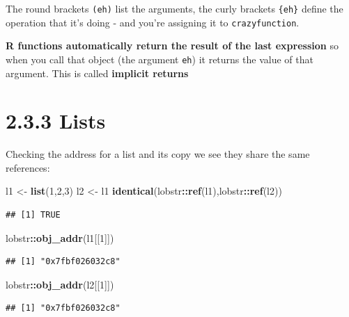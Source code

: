 \documentclass[]{book}
\newenvironment{Shaded}{\begin{snugshade}}{\end{snugshade}}
\newcommand{\DecValTok}[1]{\textcolor[rgb]{0.00,0.00,0.81}{#1}}
\newcommand{\KeywordTok}[1]{\textcolor[rgb]{0.13,0.29,0.53}{\textbf{#1}}}
\newcommand{\NormalTok}[1]{#1}
\newcommand{\OperatorTok}[1]{\textcolor[rgb]{0.81,0.36,0.00}{\textbf{#1}}}
\newcommand{\StringTok}[1]{\textcolor[rgb]{0.31,0.60,0.02}{#1}}
\begin{document}
The round brackets \texttt{(eh)} list the arguments, the curly brackets \texttt{\{eh\}} define the operation that it's doing - and you're assigning it to \texttt{crazyfunction}.

\textbf{R functions automatically return the result of the last expression} so when you call that object (the argument \texttt{eh}) it returns the value of that argument. This is called \textbf{implicit returns}

\hypertarget{lists}{%
\section*{2.3.3 Lists}\label{lists}}

Checking the address for a list and its copy we see they share the same references:

\begin{Shaded}
\begin{Highlighting}[]
\NormalTok{l1 <-}\StringTok{ }\KeywordTok{list}\NormalTok{(}\DecValTok{1}\NormalTok{,}\DecValTok{2}\NormalTok{,}\DecValTok{3}\NormalTok{)}
\NormalTok{l2 <-}\StringTok{ }\NormalTok{l1}
\KeywordTok{identical}\NormalTok{(lobstr}\OperatorTok{::}\KeywordTok{ref}\NormalTok{(l1),lobstr}\OperatorTok{::}\KeywordTok{ref}\NormalTok{(l2))}
\end{Highlighting}
\end{Shaded}

\begin{verbatim}
## [1] TRUE
\end{verbatim}

\begin{Shaded}
\begin{Highlighting}[]
\NormalTok{lobstr}\OperatorTok{::}\KeywordTok{obj_addr}\NormalTok{(l1[[}\DecValTok{1}\NormalTok{]])}
\end{Highlighting}
\end{Shaded}

\begin{verbatim}
## [1] "0x7fbf026032c8"
\end{verbatim}

\begin{Shaded}
\begin{Highlighting}[]
\NormalTok{lobstr}\OperatorTok{::}\KeywordTok{obj_addr}\NormalTok{(l2[[}\DecValTok{1}\NormalTok{]])}
\end{Highlighting}
\end{Shaded}

\begin{verbatim}
## [1] "0x7fbf026032c8"
\end{verbatim}
\end{document}
